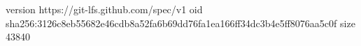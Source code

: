 version https://git-lfs.github.com/spec/v1
oid sha256:3126c8eb55682e46cdb8a52fa6b69dd76fa1ea166ff34dc3b4e5ff8076aa5c0f
size 43840
